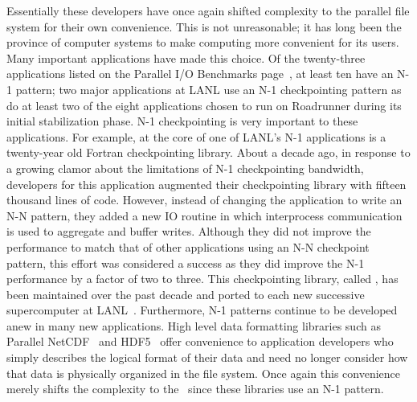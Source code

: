 Essentially these developers have once again shifted complexity to the parallel
file system for their own convenience.  This is not unreasonable; it has long
been the province of computer systems to make computing more convenient for its
users.  Many important applications have made this choice.  Of the twenty-three
applications listed on the Parallel I/O Benchmarks page~\cite{pio-benchmarks},
at least ten have an N-1 pattern; two major applications at LANL use an N-1
checkpointing pattern as do at least two of the eight applications chosen to
run on Roadrunner during its initial stabilization phase.  N-1 checkpointing is
very important to these applications.  For example, at the core of one of
LANL's N-1 applications is a twenty-year old Fortran checkpointing library.
About a decade ago, in response to a growing clamor about the limitations of
N-1 checkpointing bandwidth, developers for this application augmented their
checkpointing library with fifteen thousand lines of code.  However, instead of
changing the application to write an N-N pattern, they added a new IO routine in
which interprocess communication is used to aggregate and buffer writes.
Although they did not improve the performance to match that of other
applications using an N-N checkpoint pattern, this effort was considered a
success as they did improve the N-1 performance by a factor of two to three.
This checkpointing library, called , has been maintained over
the past decade and ported to each new successive supercomputer at
LANL~\cite{bent-personal-bulk}.  Furthermore, N-1 patterns continue to be
developed anew in many new applications.  High level data formatting libraries
such as Parallel NetCDF~\cite{pnetcdf} and HDF5~\cite{hdf5} offer convenience
to application developers who simply describes the logical format of their data
and need no longer consider how that data is physically organized in the file
system.  Once again this convenience merely shifts the complexity to the \upfs\
since these libraries use an N-1 pattern.


